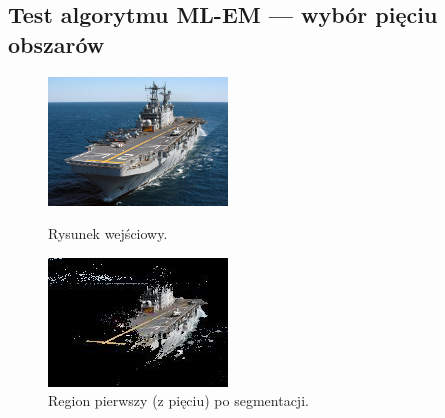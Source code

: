 \documentclass[10pt]{llncs}
\begin{document}
\subsection{Test algorytmu ML-EM --- wybór pięciu obszarów}

\begin{figure}[!htb]
  \includegraphics[width=\linewidth]{img/ship.jpg}
  \caption{Rysunek wejściowy.}\label{fig:16}
\endminipage\hfill
{}
  \includegraphics[width=\linewidth]{img/ship_k5_0.jpg}
  \caption{Region pierwszy (z pięciu) po segmentacji.}\label{fig:17}
\endminipage\hfill
{}

\end{figure}
\end{document}
